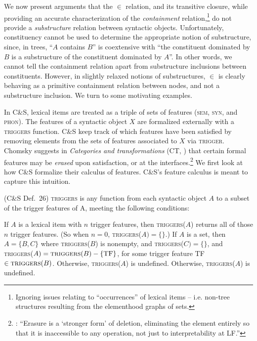 \documentclass[output=paper]{langsci/langscibook}
\begin{document}
We now present arguments that the $\in$ relation, and its transitive closure,
while providing an accurate characterization of the \emph{containment}
relation,\footnote{Ignoring issues relating to \enquote{occurrences} of lexical
items -- i.e. non-tree structures resulting from the elementhood graphs of
sets.} do not pro\-vide a \emph{substructure} relation between syntactic
objects.  Unfortunately, constituency cannot be used to determine the
appropriate notion of substructure, since, in trees, \enquote{$A$ contains $B$}
is coextensive with ``the constituent dominated by $B$ is a substructure of the
constituent dominated by $A$''. In other words, we cannot tell the containment
relation apart from substructure inclusions between constituents. However, in
slightly relaxed notions of substructures, $\in$ is clearly behaving as a
primitive containment relation between nodes, and not a substructure inclusion.
We turn to some motivating examples.

In C\&S, lexical items are treated as a triple of sets of
features (\textsc{sem}, \textsc{syn}, and \textsc{phon}).  The features of a
syntactic object $X$ are formalized externally with a \textsc{triggers}
function. C\&S keep track of which features have been
satisfied by removing elements from the sets of features associated to $X$ via
\textsc{trigger}. Chomsky suggests in \emph{Categories and transformations} (CT, 
\citeyear[Chapter 4]{Chomsky1995}) that
certain formal features may be \emph{erased} upon satisfaction, or at the
interfaces.\footnote{\citet[280]{Chomsky1995}: \enquote{Erasure is a `stronger
form' of deletion, eliminating the element entirely so that it is inaccessible
to any operation, not just to interpretability at \gls{LF}.}} We first look at how
C\&S formalize their calculus of features.
C\&S's feature calculus is meant to capture this intuition.

\ea\label{ex:33.24}(C\&S Def.\ 26) \textsc{triggers} is any
function from each syntactic object $A$ to a subset of the trigger features of
A, meeting the following conditions:
    \begin{xlisti}
        \ex   If $A$ is a lexical item with $n$ trigger features, then
        \textsc{triggers}($A$) returns all of those $n$ trigger features. (So when
        $n=0$, \textsc{triggers}($A)=\{\}$.)
        \ex If $A$ is a set, then $A=\{B,C\}$ where \textsc{triggers}($B$)
        is nonempty, and \textsc{triggers}($C)=\{\}$, and
        \textsc{triggers}($A)=\textsc{triggers}(B)-\{\text{TF}\}$, for some trigger
        feature TF $\in \textsc{triggers}(B)$.  Otherwise, \textsc{triggers}($A$)
        is undefined.
        \ex Otherwise, \textsc{triggers}($A$) is undefined.
    \end{xlisti}
\z
\end{document}
